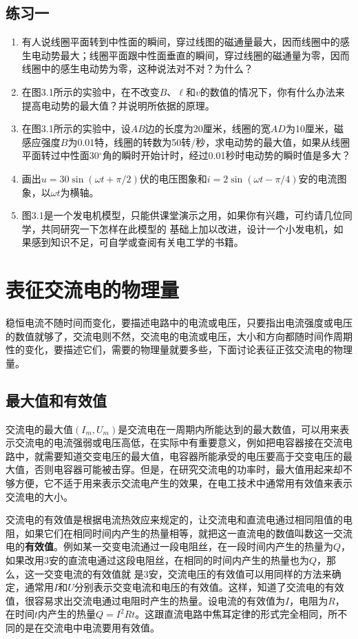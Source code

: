 \subsection*{练习一}
\begin{enumerate}
    \item 有人说线圈平面转到中性面的瞬间，穿过线图的磁通量最大，因而线圈中的感生电动势最大；线圈平面跟中性面垂直的瞬间，穿过线圈的磁通量为零，因而线圈中的感生电动势为零，这种说法对不对？为什么？
    \item 在图3.1所示的实验中，在不改变$B$、$\ell$和$v$的数值的情况下，你有什么办法来提高电动势的最大值？并说明所依据的原理。
    \item 在图3.1所示的实验中，设$AB$边的长度为20厘米，线圈的宽$AD$为10厘米，磁感应强度$B$为0.01特，线圈的转数为50转/秒，求电动势的最大值，如果从线圈平面转过中性面30$^\circ$角的瞬时开始计时，经过0.01秒时电动势的瞬时值是多大？
    \item 画出$u=30\sin(\omega t+\pi/2)$伏的电压图象和$i=2\sin(\omega t-\pi/4)$安的电流图象，以$\omega t$为横轴。
    \item 图3.1是一个发电机模型，只能供课堂演示之用，如果你有兴趣，可约请几位同学，共同研究一下怎样在此模型的	
	基础上加以改进，设计一个小发电机，如果感到知识不足，可自学或查阅有关电工学的书籍。
\end{enumerate}


\section{表征交流电的物理量}

稳恒电流不随时间而变化，要描述电路中的电流或电压，只要指出电流强度或电压的数值就够了，交流电则不然，交流电的电流或电压，大小和方向都随时间作周期性的变化，要描述它们，需要的物理量就要多些，下面讨论表征正弦交流电的物理量。

\subsection{最大值和有效值}

交流电的最大值$(I_m,U_m)$是交流电在一周期内所能达到的最大数值，可以用来表示交流电的电流强弱或电压高低，在实际中有重要意义，例如把电容器接在交流电路中，就需要知道交变电压的最大值，电容器所能承受的电压要高于交变电压的最大值，否则电容器可能被击穿。但是，在研究交流电的功率时，最大值用起来却不够方便，它不适于用来表示交流电产生的效果，在电工技术中通常用有效值来表示交流电的大小。

交流电的有效值是根据电流热效应来规定的，让交流电和直流电通过相同阻值的电阻，如果它们在相同时间内产生的热量相等，就把这一直流电的数值叫数这一交流电的\textbf{有效值}。例如某一交变电流通过一段电阻丝，在一段时间内产生的热量为$Q$，如果改用3安的直流电通过这段电阻丝，在相同的时间内产生的热量也为$Q$，那么，这一交变电流的有效值就
是3安，交流电压的有效值可以用同样的方法来确定，通常用$I$和$U$分别表示交变电流和电压的有效值。这样，知道了交流电的有效值，很容易求出交流电通过电阻时产生的热量。设电流的有效值为$I$，电阻为$R$，在时间$t$内产生的热量$Q=I^2Rt$。这跟直流电路中焦耳定律的形式完全相同，所不同的是在交流电中电流要用有效值。

